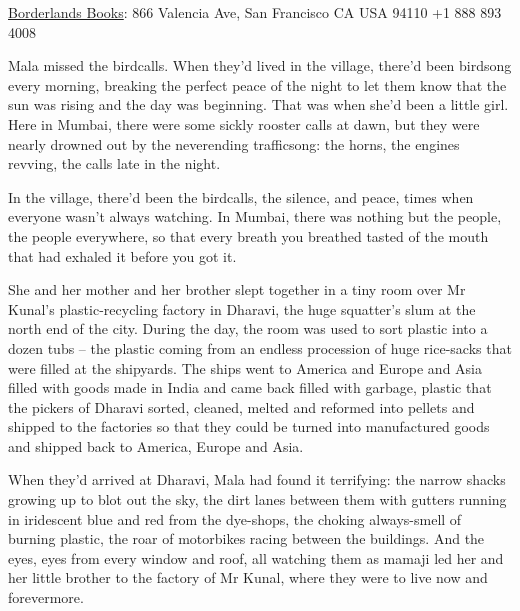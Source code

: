 {\href{http://www.borderlands-books.com/}{Borderlands Books}: 866 Valencia Ave, San Francisco CA USA 94110 +1 888 893 4008}

Mala missed the birdcalls. When they'd lived in the village,
there'd been birdsong every morning, breaking the perfect peace of
the night to let them know that the sun was rising and the day was
beginning. That was when she'd been a little girl. Here in Mumbai,
there were some sickly rooster calls at dawn, but they were nearly
drowned out by the neverending trafficsong: the horns, the engines
revving, the calls late in the night.

In the village, there'd been the birdcalls, the silence, and peace,
times when everyone wasn't always watching. In Mumbai, there was
nothing but the people, the people everywhere, so that every breath
you breathed tasted of the mouth that had exhaled it before you got
it.

She and her mother and her brother slept together in a tiny room
over Mr Kunal's plastic-recycling factory in Dharavi, the huge
squatter's slum at the north end of the city. During the day, the
room was used to sort plastic into a dozen tubs -- the plastic
coming from an endless procession of huge rice-sacks that were
filled at the shipyards. The ships went to America and Europe and
Asia filled with goods made in India and came back filled with
garbage, plastic that the pickers of Dharavi sorted, cleaned,
melted and reformed into pellets and shipped to the factories so
that they could be turned into manufactured goods and shipped back
to America, Europe and Asia.

When they'd arrived at Dharavi, Mala had found it terrifying: the
narrow shacks growing up to blot out the sky, the dirt lanes
between them with gutters running in iridescent blue and red from
the dye-shops, the choking always-smell of burning plastic, the
roar of motorbikes racing between the buildings. And the eyes, eyes
from every window and roof, all watching them as mamaji led her and
her little brother to the factory of Mr Kunal, where they were to
live now and forevermore.


